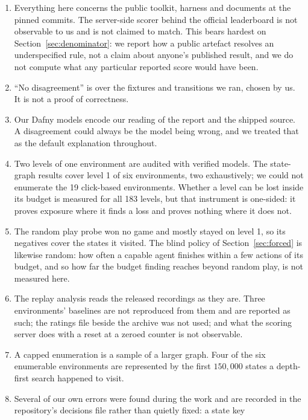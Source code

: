 \documentclass[11pt]{article}
\begin{document}
\begin{enumerate}
\item Everything here concerns the public toolkit, harness and documents at the
      pinned commits. The server-side scorer behind the official leaderboard is
      not observable to us and is not claimed to match. This bears hardest on
      Section~\ref{sec:denominator}: we report how a public artefact resolves an
      underspecified rule, not a
      claim about anyone's published result, and we do not compute what any
      particular reported score would have been.
\item ``No disagreement'' is over the fixtures and transitions we ran, chosen by
      us. It is not a proof of correctness.
\item Our Dafny models encode our reading of the report and the shipped source.
      A disagreement could always be the model being wrong, and we treated that
      as the default explanation throughout.
\item Two levels of one environment are audited with verified models. The
      state-graph results cover level 1 of six environments, two exhaustively;
      we could not enumerate the 19 click-based environments. Whether a
      level can be lost inside its budget is measured for all 183 levels, but
      that instrument is one-sided: it proves exposure where it finds a loss
      and proves nothing where it does not.
\item The random play probe won no game and mostly stayed on level 1, so its
      negatives cover the states it visited. The blind policy of
      Section~\ref{sec:forced} is likewise random: how often a capable agent
      finishes within a few actions of its budget, and so how far the budget
      finding reaches beyond random play, is not measured here.
\item The replay analysis reads the released recordings as they are. Three
      environments' baselines are not reproduced from them and are reported
      as such; the ratings file beside the archive was not used; and what the
      scoring server does with a reset at a zeroed counter is not observable.
\item A capped enumeration is a sample of a larger graph. Four of the six
      enumerable environments are represented by the first $150{,}000$ states
      a depth-first search happened to visit.
\item Several of our own errors were found during the work and are recorded in
      the repository's decisions file rather than quietly fixed: a state key

\end{enumerate}
\end{document}
